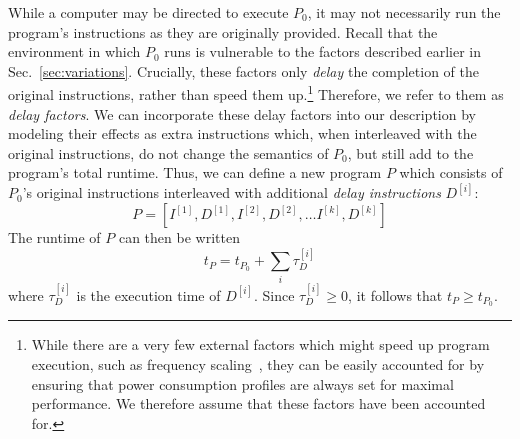 \documentclass[conference]{IEEEtran}
\begin{document}
While a computer may be directed to execute $P_0$, it may not necessarily run the program's
instructions as they are originally provided. Recall that the environment in which $P_0$
runs is vulnerable to the factors described earlier in Sec.~\ref{sec:variations}. Crucially,
these factors only \textit{delay} the completion of the original instructions, rather than
speed them up.\footnote{While there are a very few external factors which might speed up
program execution, such as frequency scaling~\cite{RHEL6}, they can be easily accounted for
by ensuring that power consumption profiles are always set for maximal performance. We
therefore assume that these factors have been accounted for.} Therefore, we refer to them as
\textit{delay factors}. We can incorporate these delay factors into our description by
modeling their effects as extra instructions which, when interleaved with the original
instructions, do not change the semantics of $P_0$, but still add to the program's total
runtime. Thus, we can define a new program $P$ which consists of $P_0$'s original
instructions interleaved with additional \textit{delay instructions} $D^{[i]}$:
%
\begin{equation}
    P = \left[I^{[1]}, D^{[1]}, I^{[2]}, D^{[2]}, \dots I^{[k]}, D^{[k]}\right]
\end{equation}
%
The runtime of $P$ can then be written
%
\begin{equation}
    t_P = t_{P_0} + \sum_{i} \tau^{[i]}_D
\end{equation}
%
where $\tau^{[i]}_D$ is the execution time of $D^{[i]}$. Since $\tau^{[i]}_D \ge 0$, it
follows that $t_P \ge t_{P_0}$.
\end{document}
